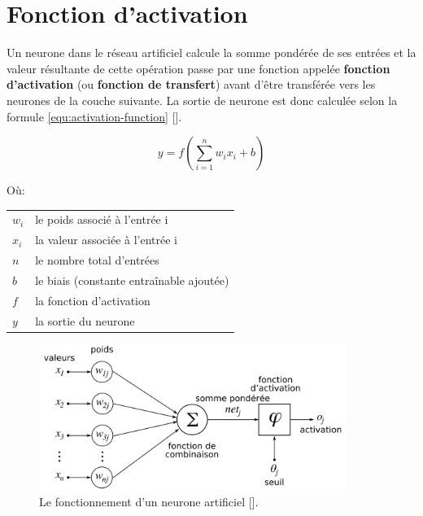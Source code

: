 \section{Fonction d'activation}
Un neurone dans le réseau artificiel calcule la somme pondérée de ses entrées
et la valeur résultante de cette opération passe par une fonction appelée
\textbf{fonction d’activation} (ou \textbf{fonction de transfert}) avant d'être
transférée vers les neurones de la couche suivante. La sortie de neurone est
donc calculée selon la formule \ref{equ:activation-function}
[\cite{mcculloch_pitts_1943_nervous_activity}].

\newenvironment{conditions}
{\par\vspace{\abovedisplayskip}\noindent\begin{tabular}{>{$}l<{$} @{${}:{}$} l}}
		{\end{tabular}\par\vspace{\belowdisplayskip}}

\begin{equation}
	y=f\left(\sum_{i=1}^{n} w_ix_i + b\right)
	\label{equ:activation-function}
\end{equation}

Où:
\begin{conditions}
	w_{i}    &  le poids associé à l'entrée i \\
	x_{i}    &  la valeur associée à l'entrée i\\
	n &  le nombre total d'entrées  \\
	b &  le biais (constante entraînable ajoutée) \\
	f &  la fonction d'activation \\
	y &  la sortie du neurone \\

\end{conditions}

\begin{figure}[hbt!]
	\centering
	\includegraphics[width=10cm]{images_pfe/neurone.png}
	\caption{Le fonctionnement d'un neurone artificiel [\cite{mcculloch_pitts_1943_nervous_activity}].}
	\label{fig:fonctionnement-neurone}
\end{figure}
\FloatBarrier
\medskip


